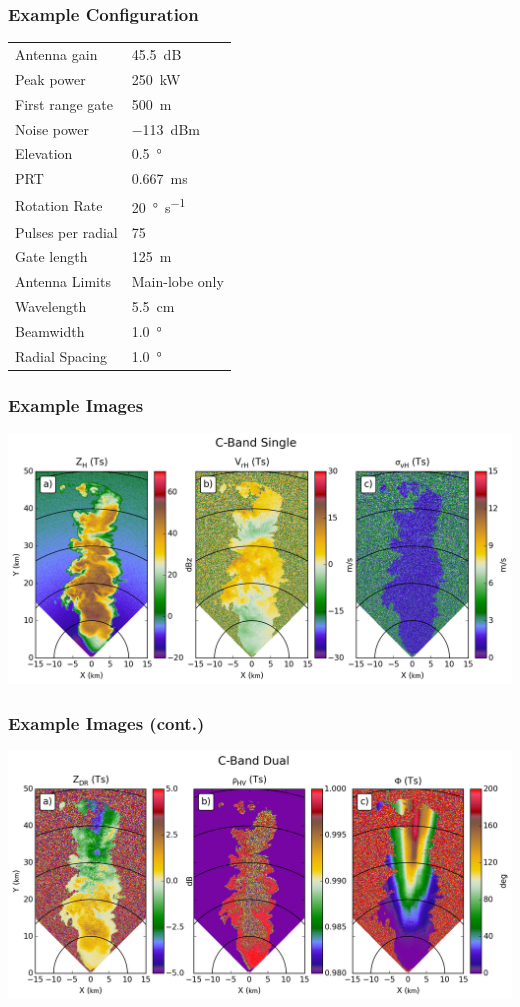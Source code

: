\documentclass[red]{beamer}
\begin{document}
\begin{frame}
	\frametitle{Example Configuration}
	\begin{center}
	    \begin{tabular}{ | l | l | }
	        \hline
	        Antenna gain & \SI{45.5}{dB} \\
	        Peak power & \SI{250}{\kilo\watt} \\
	        First range gate & \SI{500}{\meter} \\
	        Noise power & \SI{-113}{dBm} \\
	        Elevation & \SI{0.5}{\degree} \\
	        PRT & \SI{0.667}{\milli\second} \\
	        Rotation Rate & \SI{20}{\degree\per\second} \\
	        Pulses per radial & \num{75} \\
	        Gate length & \SI{125}{\meter} \\
	        Antenna Limits & Main-lobe only \\
			Wavelength &  \SI{5.5}{\centi\meter} \\
			Beamwidth & \SI{1.0}{\degree} \\
			Radial Spacing & \SI{1.0}{\degree} \\
			\hline
	    \end{tabular}
	\end{center}
\end{frame}

\begin{frame}
	\frametitle{Example Images}
	\includegraphics[scale=0.4]{figures/C_Single.png}
\end{frame}

\begin{frame}
	\frametitle{Example Images (cont.)}
	\includegraphics[scale=0.4]{figures/C_Dual.png}
\end{frame}
\end{document}
